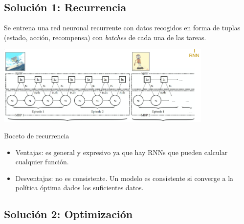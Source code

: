 \subsection{Solución 1: Recurrencia}%
\label{sub:solución_1_recurrencia}

Se entrena una red neuronal recurrente con datos recogidos en forma de tuplas (estado,
acción, recompensa) con \textit{batches} de cada una de las tareas.

\begin{center}
\includegraphics[width=0.8\textwidth]{figures/2020-07-25-175340_879x325_scrot.png}
\end{center}

\begin{algorithm}
    \caption{Boceto de recurrencia}
\end{algorithm}

\begin{itemize}
    \item Ventajas: es general y expresivo ya que hay RNNs que pueden calcular cualquier
        función.
    \item Desventajas: no es consistente. Un modelo es consistente si converge a la
        política óptima dados los suficientes datos.
\end{itemize}

\subsection{Solución 2: Optimización}%
\label{sub:solución_2_optimización}

